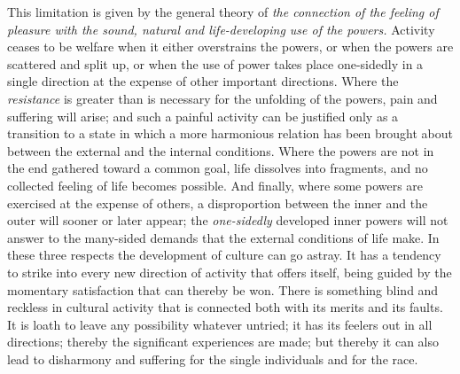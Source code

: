 \documentclass[12pt,a4paper,openany]{book}
\newcommand{\opage}[1]{\marginnote{\footnotesize\textit{[#1]}}}
\begin{document}
This limitation is given by the general theory of \textit{the connection of the feeling of pleasure with
the sound, natural and life-developing use of the powers.} Activity ceases to be welfare when it either
overstrains the powers, or when the powers are scattered and split up, or when the use of power takes
place one-sidedly in a single direction at the expense of other important directions. Where the
\textit{resistance} is greater than is necessary for
\opage{147}the unfolding of the powers, pain and suffering will arise; and such a painful activity can be
justified only as a transition to a state in which a more harmonious relation has been brought about
between the external and the internal conditions. Where the powers are not in the end gathered toward a
common goal, life dissolves into fragments, and no collected feeling of life becomes possible. And
finally, where some powers are exercised at the expense of others, a disproportion between the inner and
the outer will sooner or later appear; the \textit{one-sidedly} developed inner powers will not answer to
the many-sided demands that the external conditions of life make. In these three respects the
development of culture can go astray. It has a tendency to strike into every new direction of activity
that offers itself, being guided by the momentary satisfaction that can thereby be won. There is something
blind and reckless in cultural activity that is connected both with its merits and its faults. It is loath
to leave any possibility whatever untried; it has its feelers out in all directions; thereby the
significant experiences are made; but thereby it can also lead to disharmony and suffering for the single
individuals and for the race.
\end{document}
